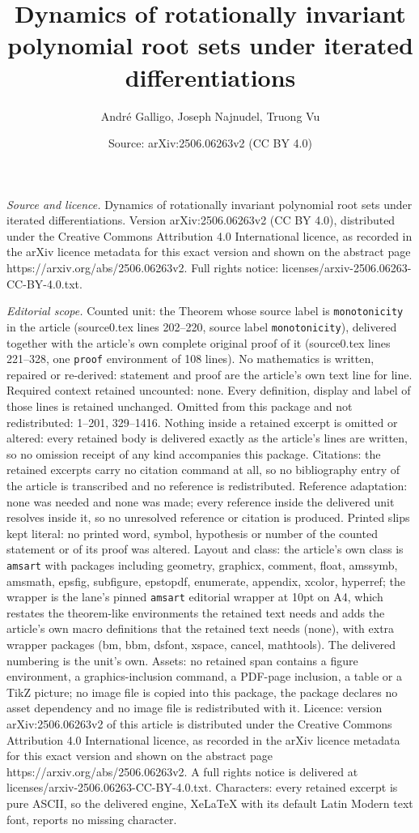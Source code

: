 \documentclass[10pt,a4paper]{amsart}
\title[Dynamics of rotationally invariant polynomial root sets unde]{Dynamics of rotationally invariant polynomial root sets under iterated differentiations}
\author{Andr\'e Galligo, Joseph Najnudel, Truong Vu}
\date{Source: arXiv:2506.06263v2 (CC BY 4.0)}
\begin{document}
\maketitle

\noindent\emph{Source and licence.} Dynamics of rotationally invariant polynomial root sets under iterated differentiations. Version arXiv:2506.06263v2 (CC BY 4.0), distributed under the Creative Commons Attribution 4.0 International licence, as recorded in the arXiv licence metadata for this exact version and shown on the abstract page https://arxiv.org/abs/2506.06263v2. Full rights notice: licenses/arxiv-2506.06263-CC-BY-4.0.txt.\par\smallskip

\noindent\textit{Editorial scope.} Counted unit: the Theorem whose source label is \texttt{monotonicity} in the article (source0.tex lines 202--220, source label \texttt{monotonicity}), delivered together with the article's own complete original proof of it (source0.tex lines 221--328, one \texttt{proof} environment of 108 lines). No mathematics is written, repaired or re-derived: statement and proof are the article's own text line for line. Required context retained uncounted: none. Every definition, display and label of those lines is retained unchanged. Omitted from this package and not redistributed: 1--201, 329--1416. Nothing inside a retained excerpt is omitted or altered: every retained body is delivered exactly as the article's lines are written, so no omission receipt of any kind accompanies this package. Citations: the retained excerpts carry no citation command at all, so no bibliography entry of the article is transcribed and no reference is redistributed. Reference adaptation: none was needed and none was made; every reference inside the delivered unit resolves inside it, so no unresolved reference or citation is produced. Printed slips kept literal: no printed word, symbol, hypothesis or number of the counted statement or of its proof was altered. Layout and class: the article's own class is \texttt{amsart} with packages including geometry, graphicx, comment, float, amssymb, amsmath, epsfig, subfigure, epstopdf, enumerate, appendix, xcolor, hyperref; the wrapper is the lane's pinned \texttt{amsart} editorial wrapper at 10pt on A4, which restates the theorem-like environments the retained text needs and adds the article's own macro definitions that the retained text needs (none), with extra wrapper packages (bm, bbm, dsfont, xspace, cancel, mathtools). The delivered numbering is the unit's own. Assets: no retained span contains a figure environment, a graphics-inclusion command, a PDF-page inclusion, a table or a TikZ picture; no image file is copied into this package, the package declares no asset dependency and no image file is redistributed with it. Licence: version arXiv:2506.06263v2 of this article is distributed under the Creative Commons Attribution 4.0 International licence, as recorded in the arXiv licence metadata for this exact version and shown on the abstract page https://arxiv.org/abs/2506.06263v2. A full rights notice is delivered at licenses/arxiv-2506.06263-CC-BY-4.0.txt. Characters: every retained excerpt is pure ASCII, so the delivered engine, XeLaTeX with its default Latin Modern text font, reports no missing character.
\end{document}
